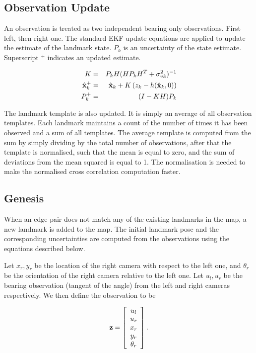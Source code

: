 \subsection{Observation Update}

An observation is treated as two independent bearing only
observations. First left, then right one. The standard EKF update
equations are applied to update the estimate of the landmark
state. $P_k$ is an uncertainty of the state estimate.  Superscript
$^+$ indicates an updated estimate.

\begin{eqnarray}
K &=& P_kH(HP_kH^T + \sigma^2_{vk})^{-1}\\
\hat{\bf x}^+_k &=& \hat{\bf x}_k + 
                      K\left(z_k - h(\hat{\bf x}_k,0) \right)\\
P^+_k &=& (I - KH)P_k
\end{eqnarray}


The landmark template is also updated. It is simply an average of all
observation templates. Each landmark maintains a count of the number
of times it has been observed and a sum of all templates. The average
template is computed from the sum by simply dividing by the total
number of observations, after that the template is normalised, such
that the mean is equal to zero, and the sum of deviations from the
mean squared is equal to 1. The normalisation is needed to make the
normalised cross correlation computation faster. 



\subsection{Genesis}

When an edge pair does not match any of the existing landmarks in
the map, a new landmark is added to the map. The initial landmark pose
and the corresponding uncertainties are computed from the observations
using the equations described below.

Let $x_r,y_r$ be the location of the right camera with respect to the
left one, and $\theta_r$ be the orientation of the right camera
relative to the left one. Let $u_l,u_r$ be the bearing observation
(tangent of the angle) from the left and right cameras
respectively. We then define the observation to be

$$
{\bf z} =  \left[
    \begin{array}{c}
       u_l\\u_r\\x_r\\y_r\\\theta_r
    \end{array}
\right].
$$

